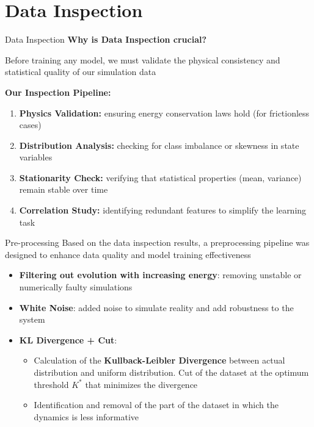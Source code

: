 \section{Data Inspection}

\begin{frame}{Data Inspection}
    \textbf{Why is Data Inspection crucial?}

    Before training any model, we must validate the physical consistency and statistical quality of our simulation data
    
    \vspace{1em}

    \textbf{Our Inspection Pipeline:}
    \begin{enumerate}
        \item \textbf{Physics Validation:} ensuring energy conservation laws hold (for frictionless cases)
        \item \textbf{Distribution Analysis:} checking for class imbalance or skewness in state variables
        \item \textbf{Stationarity Check:} verifying that statistical properties (mean, variance) remain stable over time
        \item \textbf{Correlation Study:} identifying redundant features to simplify the learning task
    \end{enumerate}

\end{frame}

\begin{frame}{Pre-processing}
    Based on the data inspection results, a preprocessing pipeline was designed to enhance data quality and model training effectiveness
    \begin{itemize}
        \item \textbf{Filtering out evolution with increasing energy}: removing unstable or numerically faulty simulations
        \item \textbf{White Noise}: added noise to simulate reality and add robustness to the system
        \item \textbf{KL Divergence + Cut}:
        \begin{itemize}
            \item Calculation of the \textbf{Kullback-Leibler Divergence} between actual distribution and uniform distribution. Cut of the dataset at the optimum threshold $K^*$ that minimizes the divergence
            \item Identification and removal of the part of the dataset in which the dynamics is less informative
        \end{itemize}
    \end{itemize}
\end{frame}

